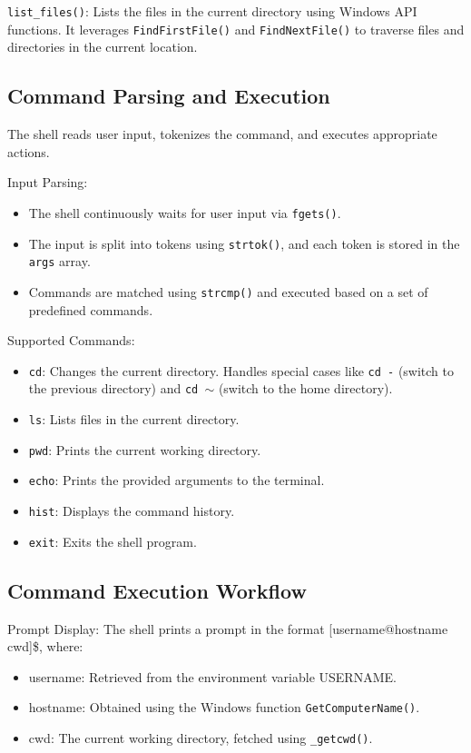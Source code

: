 \documentclass{article}
\begin{document}
\texttt{list\_files()}: Lists the files in the current directory using Windows API functions. It leverages \texttt{FindFirstFile()} and \texttt{FindNextFile()} to traverse files and directories in the current location.

\subsection{Command Parsing and Execution}

The shell reads user input, tokenizes the command, and executes appropriate actions.

Input Parsing:

\begin{itemize}
\item The shell continuously waits for user input via \texttt{fgets()}.
\item The input is split into tokens using \texttt{strtok()}, and each token is stored in the \texttt{args} array.
\item Commands are matched using \texttt{strcmp()} and executed based on a set of predefined commands.
\end{itemize}

Supported Commands:

\begin{itemize}
\item \texttt{cd}: Changes the current directory. Handles special cases like \texttt{cd -} (switch to the previous directory) and \texttt{cd $\sim$} (switch to the home directory).
\item \texttt{ls}: Lists files in the current directory.
\item \texttt{pwd}: Prints the current working directory.
\item \texttt{echo}: Prints the provided arguments to the terminal.
\item \texttt{hist}: Displays the command history.
\item \texttt{exit}: Exits the shell program.
\end{itemize}

\subsection{Command Execution Workflow}

Prompt Display: The shell prints a prompt in the format [username@hostname cwd]\$, where:

\begin{itemize}
\item username: Retrieved from the environment variable USERNAME.
\item hostname: Obtained using the Windows function \texttt{GetComputerName()}.
\item cwd: The current working directory, fetched using \texttt{\_getcwd()}.
\end{itemize}
\end{document}
